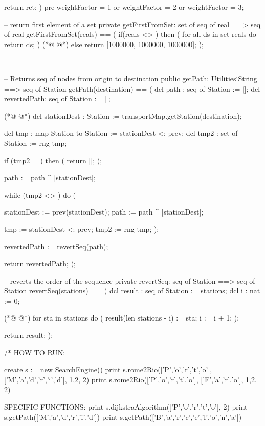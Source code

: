 \begin{vdmpp}[breaklines=true]
  return ret;
 )
 pre weightFactor = 1 or weightFactor = 2 or weightFactor = 3;
 
 -- return first element of a set 
 private getFirstFromSet: set of seq of real ==> seq of real
 getFirstFromSet(reals) == 
 (
  if(reals <> {}) then (
   for all ds in set reals do return ds;
  )
(*@
\label{getFirstFromSet:274}
@*)
  else return [1000000, 1000000, 1000000];
 );
 
 ---------------------------------------------------------------------------------------------
  
 -- Returns seq of nodes from origin to destination
 public getPath: Utilities`String ==> seq of Station
 getPath(destination) ==
 ( 
  dcl path : seq of Station := [];
  dcl revertedPath: seq of Station := [];
  
(*@
\label{getPath:286}
@*)
  dcl stationDest : Station := transportMap.getStation(destination);
  
  dcl tmp : map Station to Station := {stationDest} <: prev;
  dcl tmp2 : set of Station := rng tmp;
  
  if (tmp2 = {}) then (
   return [];
  );
  
  path := path ^ [stationDest];
  
  while (tmp2 <> {}) do (
   
   stationDest := prev(stationDest);
   path := path ^ [stationDest];
   
   tmp := {stationDest} <: prev;
   tmp2 := rng tmp;
  );
  
  revertedPath := revertSeq(path);
  
  return revertedPath;
 );
 
 -- reverts the order of the sequence
 private revertSeq: seq of Station ==> seq of Station
 revertSeq(stations) ==
 (
  dcl result : seq of Station := stations;
  dcl i : nat := 0;
  
(*@
\label{revertSeq:318}
@*)
  for sta in stations do (
    result(len stations - i) := sta;
    i := i + 1;  
  );
  
  return result;
 );
 
 /*
  HOW TO RUN:
  
  create s := new SearchEngine()
  print s.rome2Rio(['P','o','r','t','o'], ['M','a','d','r','i','d'], {1,2}, 2)
  print s.rome2Rio(['P','o','r','t','o'], ['F','a','r','o'], {1,2}, 2)
  
  SPECIFIC FUNCTIONS: 
  print s.dijkstraAlgorithm(['P','o','r','t','o'], 2)
  print s.getPath(['M','a','d','r','i','d'])
  print s.getPath(['B','a','r','c','e','l','o','n','a'])
  

\end{vdmpp}
